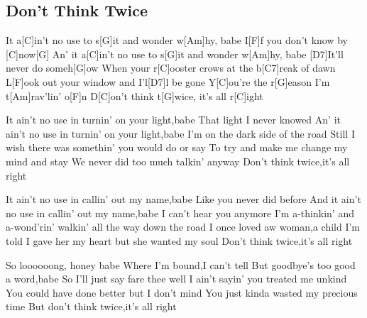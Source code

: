 \subsection*{Don't Think Twice   }
\begin{guitar}
It a[C]in't no use to s[G]it and wonder w[Am]hy, babe 
I[F]f you don't know by [C]now[G]{} 
An' it a[C]in't no use to s[G]it and wonder w[Am]hy, babe 
[D7]It'll never do someh[G]ow 
When your r[C]ooster crows at the b[C7]reak of dawn 
L[F]ook out your window and I'l[D7]l be gone 
Y[C]ou're the r[G]eason I'm t[Am]rav'lin' o[F]n 
D[C]on't think t[G]wice, it's all r[C]ight 



It ain't no use in turnin' on your light,babe
That light I never knowed
An' it ain't no use in turnin' on your light,babe
I'm on the dark side of the road
Still I wish there was somethin' you would do or say
To try and make me change my mind and stay
We never did too much talkin' anyway
Don't think twice,it's all right



It ain't no use in callin' out my name,babe
Like you never did before
And it ain't no use in callin' out my name,babe
I can't hear you anymore
I'm a-thinkin' and a-wond'rin' walkin' all the way down the road
I once loved aw woman,a child I'm told
I gave her my heart but she wanted my soul
Don't think twice,it's all right



So loooooong, honey babe
Where I'm bound,I can't tell
But goodbye's too good a word,babe
So I'll just say fare thee well
I ain't sayin' you treated me unkind
You could have done better but I don't mind
You just kinda wasted my precious time
But don't think twice,it's all right
\end{guitar}
